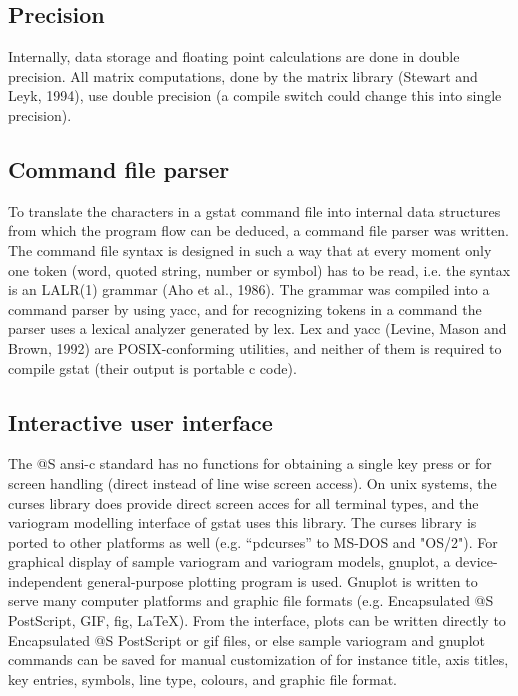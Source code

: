 \documentclass{article}
\begin{document}
\subsection{Precision}
Internally, data storage and floating point calculations are done in
double precision. All matrix computations, done by the matrix library
(Stewart and Leyk, 1994), use double precision (a compile switch could
change this into single precision).

\subsection{Command file parser}
To translate the characters in a gstat command file into internal data
structures from which the program flow can be deduced, a command file
parser was written. The command file syntax is designed in such a way
that at every moment only one token (word, quoted string, number or
symbol) has to be read, i.e. the syntax is an LALR(1) grammar (Aho et
al., 1986). The grammar was compiled into a command parser by using
yacc, and for recognizing tokens in a command the parser uses a lexical
analyzer generated by lex. Lex and yacc (Levine, Mason and Brown, 1992)
are POSIX-conforming utilities, and neither of them is required to
compile gstat (their output is portable c code).

\subsection{Interactive user interface}
The @S ansi-c standard has no functions for obtaining a single key press
or for screen handling (direct instead of line wise screen access). On
unix systems, the curses library does provide direct screen acces for
all terminal types, and the variogram modelling interface of gstat uses
this library. The curses library is ported to other platforms as well
(e.g. ``pdcurses'' to MS-DOS and "OS/2"). For graphical display of
sample variogram and variogram models, gnuplot, a device-independent
general-purpose plotting program is used. Gnuplot is written to serve
many computer platforms and graphic file formats (e.g. Encapsulated @S
PostScript, GIF, fig, LaTeX). From the interface, plots can be written
directly to Encapsulated @S PostScript or gif files, or else sample
variogram and gnuplot commands can be saved for manual customization of
for instance title, axis titles, key entries, symbols, line type,
colours, and graphic file format.
\end{document}
